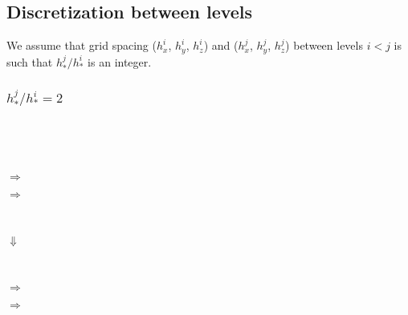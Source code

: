 \documentclass[10pt]{article}
\begin{document}
\subsection{Discretization between levels} \label{ss:discret-between-levels}

We assume that grid spacing ($h^i_x$, $h^i_y$, $h^i_z$) and 
($h^j_x$, $h^j_y$, $h^j_z$) between levels $i < j$ is such that
$h^j_* / h^i_*$ is an integer.


\subsubsection{$h^j_* / h^i_* = 2$}


\begin{center}
\begin{minipage}{1.25in}
\end{minipage} \ \ \ 
\begin{minipage}{1.25in}
\end{minipage} \ \ \ 
\begin{minipage}{1.25in}
\end{minipage}
\end{center}



\begin{center}
\begin{minipage}{2in}
\end{minipage}$\Rightarrow$
\begin{minipage}{2in}
\end{minipage}$\Rightarrow$
\begin{minipage}{2in}
\end{minipage} \\
\begin{minipage}{4.5in}
\hfill $\Downarrow$
\end{minipage} \\
\begin{minipage}{2in}
\end{minipage}$\Rightarrow$
\begin{minipage}{2in}
\end{minipage}$\Rightarrow$
\begin{minipage}{2in}
\end{minipage}
\end{center}
\end{document}
